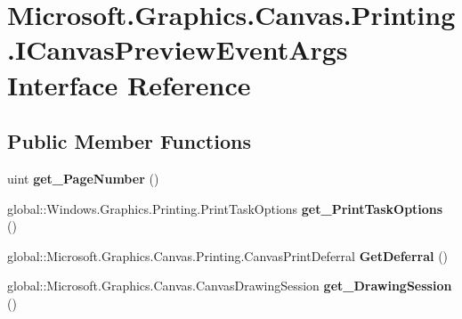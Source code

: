 \hypertarget{interface_microsoft_1_1_graphics_1_1_canvas_1_1_printing_1_1_i_canvas_preview_event_args}{}\section{Microsoft.\+Graphics.\+Canvas.\+Printing.\+I\+Canvas\+Preview\+Event\+Args Interface Reference}
\label{interface_microsoft_1_1_graphics_1_1_canvas_1_1_printing_1_1_i_canvas_preview_event_args}
\subsection*{Public Member Functions}
\begin{DoxyCompactItemize}
\item 
\mbox{\label{interface_microsoft_1_1_graphics_1_1_canvas_1_1_printing_1_1_i_canvas_preview_event_args_a3a70ed88006f13b80460bcacd2b53cc4}} 
uint {\bfseries get\+\_\+\+Page\+Number} ()
\item 
\mbox{\label{interface_microsoft_1_1_graphics_1_1_canvas_1_1_printing_1_1_i_canvas_preview_event_args_a90316527a368a9c28b4a5f6c48a79ff5}} 
global\+::\+Windows.\+Graphics.\+Printing.\+Print\+Task\+Options {\bfseries get\+\_\+\+Print\+Task\+Options} ()
\item 
\mbox{\label{interface_microsoft_1_1_graphics_1_1_canvas_1_1_printing_1_1_i_canvas_preview_event_args_ac14e8353363cc191ad46607fb56c0566}} 
global\+::\+Microsoft.\+Graphics.\+Canvas.\+Printing.\+Canvas\+Print\+Deferral {\bfseries Get\+Deferral} ()
\item 
\mbox{\label{interface_microsoft_1_1_graphics_1_1_canvas_1_1_printing_1_1_i_canvas_preview_event_args_a3986afef79f94250c88e589b3a6c7bf8}} 
global\+::\+Microsoft.\+Graphics.\+Canvas.\+Canvas\+Drawing\+Session {\bfseries get\+\_\+\+Drawing\+Session} ()
\item 

\end{DoxyCompactItemize}
